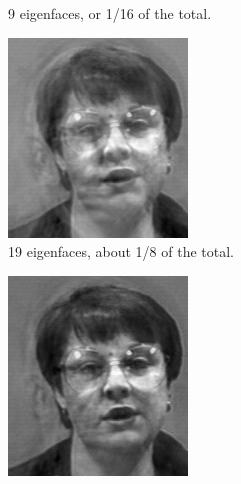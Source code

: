 \begin{figure}
\begin{subfigure}[b]{0.3\textwidth}
\caption{9 eigenfaces, or 1/16 of the total.}
\label{fig:9_efaces}
\end{subfigure}
\begin{subfigure}[b]{0.3\textwidth}
\includegraphics[width=\textwidth]{rebuiltEighth.png}
\caption{19 eigenfaces, about 1/8 of the total.}
\label{fig:19_efaces}
\end{subfigure}
\begin{subfigure}[b]{0.3\textwidth}
\includegraphics[width=\textwidth]{rebuiltFourth.png}

\end{subfigure}
\end{figure}

